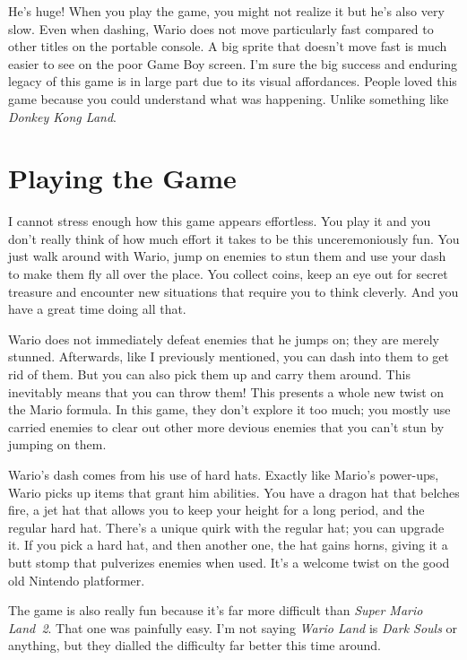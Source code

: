 \documentclass{book}
\begin{document}
He’s huge! When you play the game, you might not realize it but he’s also very slow. Even when dashing, Wario does not move particularly fast compared to other titles on the portable console. A big sprite that doesn’t move fast is much easier to see on the poor Game Boy screen. I’m sure the big success and enduring legacy of this game is in large part due to its visual affordances. People loved this game because you could understand what was happening. Unlike something like \emph{Donkey Kong Land}.

\FloatBarrier\needspace{10mm}\section*{Playing the Game}\nopagebreak[4]

I cannot stress enough how this game appears effortless. You play it and you don’t really think of how much effort it takes to be this unceremoniously fun. You just walk around with Wario, jump on enemies to stun them and use your dash to make them fly all over the place. You collect coins, keep an eye out for secret treasure and encounter new situations that require you to think cleverly. And you have a great time doing all that.

Wario does not immediately defeat enemies that he jumps on; they are merely stunned. Afterwards, like I previously mentioned, you can dash into them to get rid of them. But you can also pick them up and carry them around. This inevitably means that you can throw them! This presents a whole new twist on the Mario formula. In this game, they don’t explore it too much; you mostly use carried enemies to clear out other more devious enemies that you can’t stun by jumping on them.

Wario’s dash comes from his use of hard hats. Exactly like Mario’s power-ups, Wario picks up items that grant him abilities. You have a dragon hat that belches fire, a jet hat that allows you to keep your height for a long period, and the regular hard hat. There’s a unique quirk with the regular hat; you can upgrade it. If you pick a hard hat, and then another one, the hat gains horns, giving it a butt stomp that pulverizes enemies when used. It’s a welcome twist on the good old Nintendo platformer.

The game is also really fun because it’s far more difficult than \emph{Super Mario Land 2}. That one was painfully easy. I’m not saying \emph{Wario Land} is \emph{Dark Souls} or anything, but they dialled the difficulty far better this time around.
\end{document}
